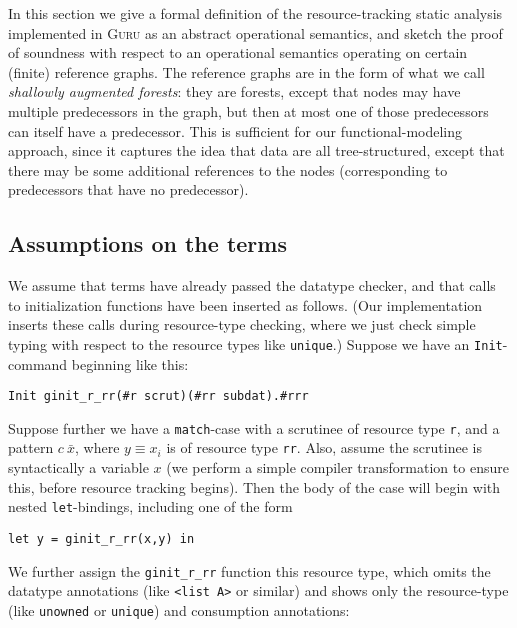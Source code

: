 \documentclass[9pt,natbib]{sigplanconf}
\begin{document}
In this section we give a formal definition of the resource-tracking
static analysis implemented in \textsc{Guru} as an abstract
operational semantics, and sketch the proof of soundness with respect
to an operational semantics operating on certain (finite) reference graphs.
The reference graphs are in the form of what we call \emph{shallowly
  augmented forests}: they are forests, except that nodes may have
multiple predecessors in the graph, but then at most one of those
predecessors can itself have a predecessor. This is sufficient for our
functional-modeling approach, since it captures the idea that data are
all tree-structured, except that there may be some additional
references to the nodes (corresponding to predecessors that have no
predecessor).

\subsection{Assumptions on the terms}

We assume that terms have already passed the datatype checker, and
that calls to initialization functions have been inserted as follows.
(Our implementation inserts these calls during resource-type checking,
where we just check simple typing with respect to the resource types
like \texttt{unique}.)  Suppose we have an \texttt{Init}-command
beginning like this:

\begin{verbatim}
Init ginit_r_rr(#r scrut)(#rr subdat).#rrr
\end{verbatim}

\noindent Suppose further we have a \texttt{match}-case with a
scrutinee of resource type \texttt{r}, and a pattern $c\ \bar{x}$,
where $y\equiv x_i$ is of resource type \texttt{rr}.  Also, assume the
scrutinee is syntactically a variable $x$ (we perform a simple compiler
transformation to ensure this, before resource tracking begins).  Then
the body of the case will begin with nested \texttt{let}-bindings,
including one of the form

\begin{verbatim}
let y = ginit_r_rr(x,y) in
\end{verbatim}

\noindent We further assign the \texttt{ginit\_r\_rr} function this
resource type, which omits the datatype annotations (like
\texttt{<list A>} or similar) and shows only the resource-type (like
\texttt{unowned} or \texttt{unique}) and consumption annotations:
\end{document}
